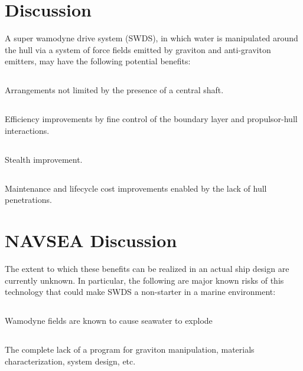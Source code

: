 \documentclass[12pt,courier]{navyletter}
\begin{document}
\section{Discussion} A super wamodyne drive system (SWDS), in which water is manipulated around the hull via a system of force fields emitted by graviton and anti-graviton emitters, may have the following potential benefits:

\subsection{} Arrangements not limited by the presence of a central shaft.

\subsection{} Efficiency improvements by fine control of the boundary layer and propulsor-hull interactions.

\subsection{} Stealth improvement. 

\subsection{} Maintenance and lifecycle cost improvements enabled by the lack of hull penetrations.

\section{NAVSEA Discussion} The extent to which these benefits can be realized in an actual ship design are currently unknown.  In particular, the following are major known risks of this technology that could make SWDS a non-starter in a marine environment:

\subsection{} Wamodyne fields are known to cause seawater to explode

\subsection{} The complete lack of a program for graviton manipulation, materials characterization, system design, etc.
\end{document}
